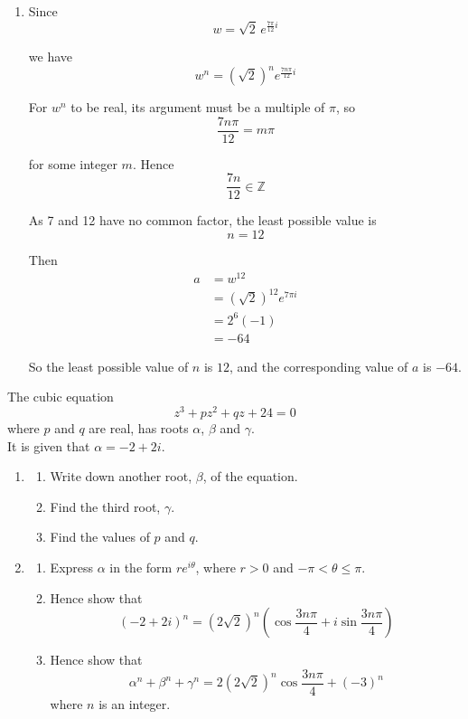 \documentclass[leqno]{article}
\begin{document}
\begin{enumerate}[
  label=\textbf{\arabic*.},
  leftmargin=*,
  topsep=0pt,
  partopsep=0pt,
  parsep=0pt
]
\begin{djsSolution}
\begin{enumerate}[label=\textbf{(\roman*)}]
So the modulus and argument of \(w\) are
\[
|w|=\sqrt{2},
\qquad
\arg(w)=\frac{7\pi}{12}
\]

\item Since
\[
w=\sqrt{2}\,e^{\frac{7\pi}{12}i}
\]

we have
\[
w^n=(\sqrt{2})^n e^{\frac{7n\pi}{12}i}
\]

For \(w^n\) to be real, its argument must be a multiple of \(\pi\), so
\[
\frac{7n\pi}{12}=m\pi
\]

for some integer \(m\). Hence
\[
\frac{7n}{12}\in\mathbb{Z}
\]

As 7 and 12 have no common factor, the least possible value is
\[
n=12
\]

Then
\begin{align*}
a
&=w^{12} \\
&=(\sqrt{2})^{12}e^{7\pi i} \\
&=2^6(-1) \\
&=-64
\end{align*}

So the least possible value of \(n\) is \(12\), and the corresponding value of \(a\) is \(-64\).
\end{enumerate}
\end{djsSolution}


\newpage

\questionitem

The cubic equation
\[
z^3+pz^2+qz+24=0
\]
where $p$ and $q$ are real, has roots $\alpha$, $\beta$ and $\gamma$. \\
It is given that $\alpha=-2+2i$. \\
\begin{enumerate}[label=\textbf{(\alph*)}]
  \item
  \begin{enumerate}[label=(\roman*)]
    \item Write down another root, $\beta$, of the equation. 
    \item Find the third root, $\gamma$. 
    \item Find the values of $p$ and $q$.  \\
  \end{enumerate}
  \item
  \begin{enumerate}[label=(\roman*)]
    \item Express $\alpha$ in the form $re^{i\theta}$, where $r>0$ and $-\pi<\theta\leq \pi$. 
    \item Hence show that
    \[
    (-2+2i)^n=(2\sqrt{2})^n\left(\cos \frac{3n\pi}{4}+i\sin \frac{3n\pi}{4}\right)
    \]
    \item Hence show that
    \[
    \alpha^n+\beta^n+\gamma^n=2(2\sqrt{2})^n\cos \frac{3n\pi}{4}+(-3)^n
    \]
    where $n$ is an integer. 
  \end{enumerate}
\end{enumerate}


\end{enumerate}
\end{document}
